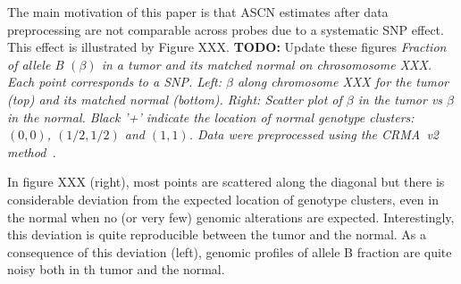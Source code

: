 \documentclass[10pt]{bmc_article}
\newenvironment{bmcformat}{\fussy\setboolean{publ}{true}}{\fussy}
\newenvironment{TODO}{\color{red}\textbf{TODO:}}{}
\begin{document}
\begin{bmcformat}
The main motivation of this paper is that ASCN estimates after data preprocessing are not comparable across probes due to a systematic SNP effect. This effect is illustrated by Figure XXX. 
\begin{TODO}
Update these figures
\end{TODO}
\emph{Fraction of allele B $(\beta)$ in a tumor and its matched normal on chrosomosome XXX. Each point corresponds to a SNP. Left: $\beta$  along chromosome XXX for the tumor (top) and its matched normal (bottom). Right: Scatter plot of $\beta$ in the tumor vs $\beta$ in the normal. Black '+' indicate the location of normal genotype clusters: $(0,0)$, $(1/2,1/2)$ and $(1,1)$. Data were preprocessed using the CRMA~v2 method~\cite{BengtssonH_etal_2009b}.
}

In figure XXX (right), most points are scattered along the diagonal but there is considerable deviation from the expected location of genotype clusters, even in the normal when no (or very few) genomic alterations are expected. Interestingly, this deviation is quite reproducible between the tumor and the normal. As a consequence of this deviation (left), genomic profiles of allele B fraction are quite noisy both in th tumor and the normal. 



\end{bmcformat}
\end{document}
